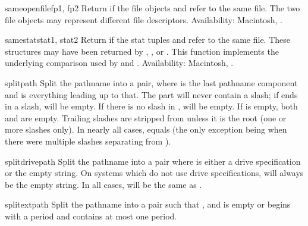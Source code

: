 \begin{funcdesc}{sameopenfile}{fp1, fp2}
Return  if the file objects  and  refer to the
same file.  The two file objects may represent different file
descriptors.
Availability:  Macintosh, \UNIX.
\end{funcdesc}

\begin{funcdesc}{samestat}{stat1, stat2}
Return  if the stat tuples  and  refer to
the same file.  These structures may have been returned by
, , or .  This
function implements the underlying comparison used by
 and .
Availability:  Macintosh, \UNIX.
\end{funcdesc}

\begin{funcdesc}{split}{path}
Split the pathname  into a pair,  where  is the last pathname component and
 is everything leading up to that.  The  part will
never contain a slash; if  ends in a slash,  will
be empty.  If there is no slash in ,  will be
empty.  If  is empty, both  and  are
empty.  Trailing slashes are stripped from  unless it is the
root (one or more slashes only).  In nearly all cases,
 equals  (the only
exception being when there were multiple slashes separating 
from ).
\end{funcdesc}

\begin{funcdesc}{splitdrive}{path}
Split the pathname  into a pair  where  is either a drive specification or the
empty string.  On systems which do not use drive specifications,
 will always be the empty string.  In all cases,
 will be the same as .
\end{funcdesc}

\begin{funcdesc}{splitext}{path}
Split the pathname  into a pair  
such that ,
and  is empty or begins with a period and contains
at most one period.
\end{funcdesc}

